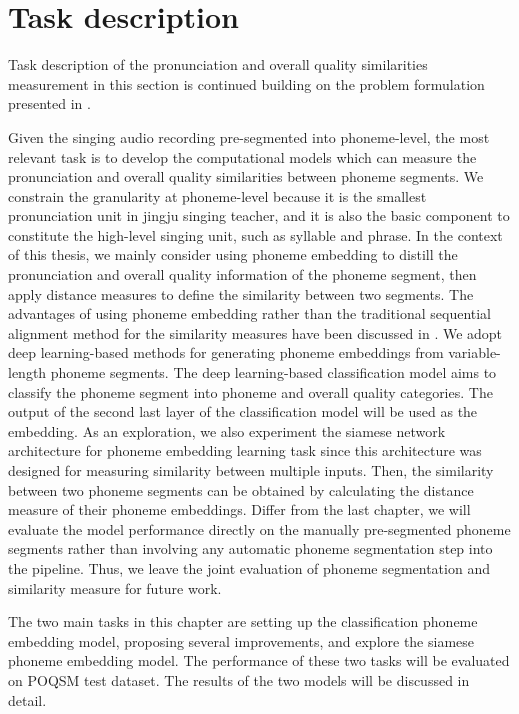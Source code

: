 \section{Task description}

Task description of the pronunciation and overall quality similarities measurement in this section is continued building on the problem formulation presented in .

Given the singing audio recording pre-segmented into phoneme-level, the most relevant task is to develop the computational models which can measure the pronunciation and overall quality similarities between phoneme segments. We constrain the granularity at phoneme-level because it is the smallest pronunciation unit in jingju singing teacher, and it is also the basic component to constitute the high-level singing unit, such as syllable and phrase. In the context of this thesis, we mainly consider using phoneme embedding to distill the pronunciation and overall quality information of the phoneme segment, then apply distance measures to define the similarity between two segments. The advantages of using phoneme embedding rather than the traditional sequential alignment method for the similarity measures have been discussed in . We adopt deep learning-based methods for generating phoneme embeddings from variable-length phoneme segments. The deep learning-based classification model aims to classify the phoneme segment into phoneme and overall quality categories. The output of the second last layer of the classification model will be used as the embedding. As an exploration, we also experiment the siamese network architecture for phoneme embedding learning task since this architecture was designed for measuring similarity between multiple inputs. Then, the similarity between two phoneme segments can be obtained by calculating the distance measure of their phoneme embeddings. Differ from the last chapter, we will evaluate the model performance directly on the manually pre-segmented phoneme segments rather than involving any automatic phoneme segmentation step into the pipeline. Thus, we leave the joint evaluation of phoneme segmentation and similarity measure for future work.

The two main tasks in this chapter are setting up the classification phoneme embedding model, proposing several improvements, and explore the siamese phoneme embedding model. The performance of these two tasks will be evaluated on \gls{POQSM} test dataset. The results of the two models will be discussed in detail.

